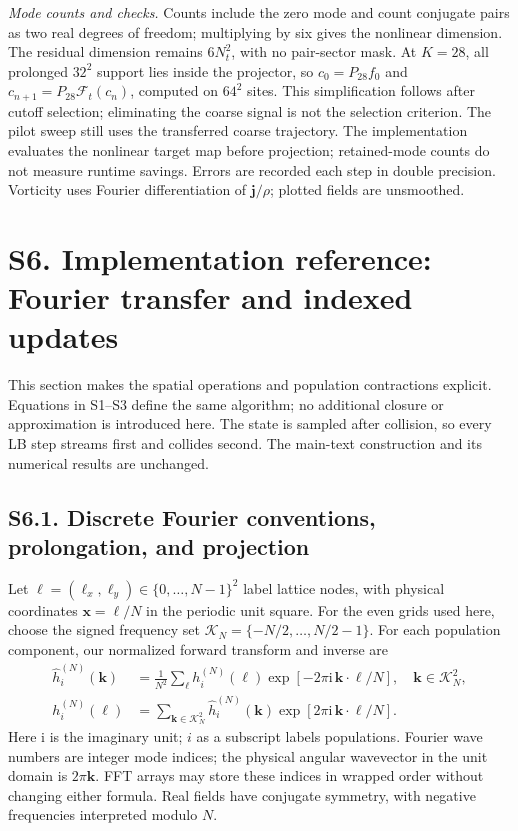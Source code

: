 \documentclass[10pt,letterpaper]{article}
\newcommand{\F}{\mathcal F}\newcommand{\B}{\mathcal B}
\begin{document}
\textit{Mode counts and checks.} Counts include the zero mode and count conjugate pairs as two real degrees of freedom; multiplying by six gives the nonlinear dimension. The residual dimension remains $6N_t^2$, with no pair-sector mask. At $K=28$, all prolonged $32^2$ support lies inside the projector, so $c_0=P_{28}f_0$ and $c_{n+1}=P_{28}\F_t(c_n)$, computed on $64^2$ sites. This simplification follows after cutoff selection; eliminating the coarse signal is not the selection criterion. The pilot sweep still uses the transferred coarse trajectory. The implementation evaluates the nonlinear target map before projection; retained-mode counts do not measure runtime savings. Errors are recorded each step in double precision. Vorticity uses Fourier differentiation of $\bm j/\rho$; plotted fields are unsmoothed.

\newpage
\section*{S6. Implementation reference: Fourier transfer and indexed updates}
This section makes the spatial operations and population contractions explicit. Equations in S1--S3 define the same algorithm; no additional closure or approximation is introduced here. The state is sampled after collision, so every LB step streams first and collides second. The main-text construction and its numerical results are unchanged.

\subsection*{S6.1. Discrete Fourier conventions, prolongation, and projection}
Let $\bm\ell=(\ell_x,\ell_y)\in\{0,\ldots,N-1\}^2$ label lattice nodes, with physical coordinates $\bm x=\bm\ell/N$ in the periodic unit square. For the even grids used here, choose the signed frequency set $\mathcal K_N=\{-N/2,\ldots,N/2-1\}$. For each population component, our normalized forward transform and inverse are
\begin{align}
 \widehat h_i^{(N)}(\bm k)&=\frac1{N^2}\sum_{\bm\ell}h_i^{(N)}(\bm\ell)
 \exp[-2\pi\mathrm i\,\bm k\cdot\bm\ell/N],\quad \bm k\in\mathcal K_N^2,\label{eq:dft}\\
 h_i^{(N)}(\bm\ell)&=\sum_{\bm k\in\mathcal K_N^2}\widehat h_i^{(N)}(\bm k)
 \exp[2\pi\mathrm i\,\bm k\cdot\bm\ell/N].\label{eq:idft}
\end{align}
Here $\mathrm i$ is the imaginary unit; $i$ as a subscript labels populations. Fourier wave numbers are integer mode indices; the physical angular wavevector in the unit domain is $2\pi\bm k$. FFT arrays may store these indices in wrapped order without changing either formula. Real fields have conjugate symmetry, with negative frequencies interpreted modulo $N$.
\end{document}
